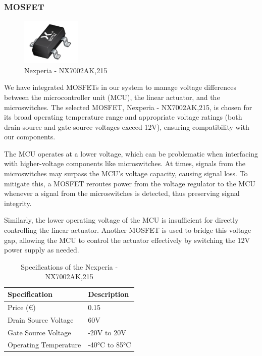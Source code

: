 \documentclass[12pt,a4paper]{article}
\begin{document}
\subsubsection{MOSFET}
\begin{figure}[h]
    \centering
    \includegraphics[width=0.25\textwidth]{images/MOSFET.png}
    \caption{Nexperia - NX7002AK,215 \cite{mosfet}}
\end{figure}
We have integrated MOSFETs in our system to manage voltage differences between the microcontroller unit (MCU), the linear actuator, and the microswitches. The selected MOSFET, Nexperia - NX7002AK,215, is chosen for its broad operating temperature range and appropriate voltage ratings (both drain-source and gate-source voltages exceed 12V), ensuring compatibility with our components.

The MCU operates at a lower voltage, which can be problematic when interfacing with higher-voltage components like microswitches. At times, signals from the microswitches may surpass the MCU's voltage capacity, causing signal loss. To mitigate this, a MOSFET reroutes power from the voltage regulator to the MCU whenever a signal from the microswitches is detected, thus preserving signal integrity.

Similarly, the lower operating voltage of the MCU is insufficient for directly controlling the linear actuator. Another MOSFET is used to bridge this voltage gap, allowing the MCU to control the actuator effectively by switching the 12V power supply as needed.
\begin{table}[h]
    \centering
    \begin{tabular}{|l|l|}
    \hline
    \textbf{Specification} & \textbf{Description} \\ \hline
    Price (€)              & 0.15                 \\ \hline
    Drain Source Voltage   & 60V                  \\ \hline
    Gate Source Voltage    & -20V to 20V          \\ \hline
    Operating Temperature  & -40°C to 85°C        \\ \hline
    \end{tabular}
    \caption{Specifications of the Nexperia - NX7002AK,215}
    \label{tab:rohm_bd9g341aefj_lbe2}
    \end{table}
\end{document}
